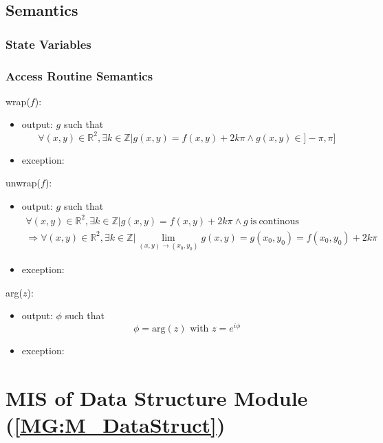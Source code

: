 \documentclass[12pt, titlepage]{article}
\begin{document}
\subsection{Semantics}

\subsubsection{State Variables}


\subsubsection{Access Routine Semantics}

\noindent wrap($f$):
\begin{itemize} 
\item output: $g$ such that
\begin{equation*}
\forall (x,y) \in \mathbb{R}^2, \exists k \in \mathbb{Z} | g(x,y) =f(x,y)+ 2k\pi \wedge g(x,y) \in ]-\pi,\pi]
\end{equation*} 
\item exception:
\end{itemize}

\noindent unwrap($f$):
\begin{itemize} 
\item output: $g$ such that
\begin{equation*}
\begin{gathered}
\forall (x,y) \in \mathbb{R}^2, \exists k \in \mathbb{Z} | g(x,y) =f(x,y) + 2k\pi \wedge g \ \text{is} \  \text{continous}\\
\Rightarrow \forall (x,y) \in \mathbb{R}^2, \exists k \in \mathbb{Z} | \lim_{(x,y)\to (x_0,y_0)} g(x,y) = g(x_0,y_0) = f(x_0,y_0) + 2k\pi
\end{gathered}
\end{equation*}
\item exception:
\end{itemize}

\noindent arg($z$):
\begin{itemize} 
\item output: $\phi$ such that
\begin{equation*}
\phi=\text{arg}(z) \text{ with } z=e^{i\phi}
\end{equation*}
\item exception:
\end{itemize}


\section{MIS of Data Structure Module (\texorpdfstring{\cref{MG:M_DataStruct}}))} \label{MIS_DataStruct}
\end{document}
